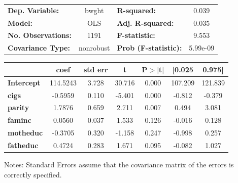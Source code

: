 \begin{center}
\begin{tabular}{lclc}
\toprule
\textbf{Dep. Variable:}    &     bwght     & \textbf{  R-squared:         } &     0.039   \\
\textbf{Model:}            &      OLS      & \textbf{  Adj. R-squared:    } &     0.035   \\
\textbf{No. Observations:} &       1191    & \textbf{  F-statistic:       } &     9.553   \\
\textbf{Covariance Type:}  &   nonrobust   & \textbf{  Prob (F-statistic):} &  5.99e-09   \\
\bottomrule
\end{tabular}
\begin{tabular}{lcccccc}
                   & \textbf{coef} & \textbf{std err} & \textbf{t} & \textbf{P$> |$t$|$} & \textbf{[0.025} & \textbf{0.975]}  \\
\midrule
\textbf{Intercept} &     114.5243  &        3.728     &    30.716  &         0.000        &      107.209    &      121.839     \\
\textbf{cigs}      &      -0.5959  &        0.110     &    -5.401  &         0.000        &       -0.812    &       -0.379     \\
\textbf{parity}    &       1.7876  &        0.659     &     2.711  &         0.007        &        0.494    &        3.081     \\
\textbf{faminc}    &       0.0560  &        0.037     &     1.533  &         0.126        &       -0.016    &        0.128     \\
\textbf{motheduc}  &      -0.3705  &        0.320     &    -1.158  &         0.247        &       -0.998    &        0.257     \\
\textbf{fatheduc}  &       0.4724  &        0.283     &     1.671  &         0.095        &       -0.082    &        1.027     \\
\bottomrule
\end{tabular}
\end{center}

Notes: \newline
 [1] Standard Errors assume that the covariance matrix of the errors is correctly specified.
